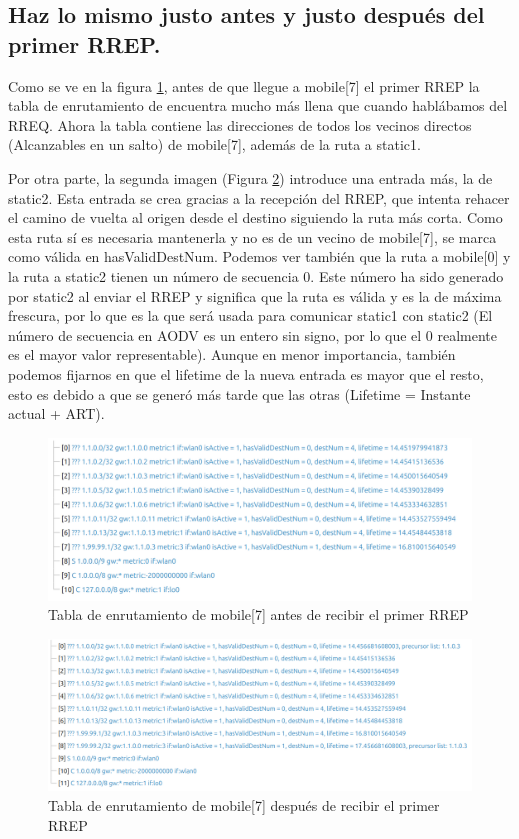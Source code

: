 \subsection{Haz lo mismo justo antes y justo después del primer RREP.}

Como se ve en la figura \ref{fig:rtable_prev_mob7RREP}, antes de que llegue a mobile[7] el primer RREP la tabla de enrutamiento de encuentra mucho más llena que cuando hablábamos del RREQ. Ahora la tabla contiene las direcciones de todos los vecinos directos (Alcanzables en un salto) de mobile[7], además de la ruta a static1.

Por otra parte, la segunda imagen (Figura \ref{fig:rtable_post_mob7RREP}) introduce una entrada más, la de static2. Esta entrada se crea gracias a la recepción del RREP, que intenta rehacer el camino de vuelta al origen desde el destino siguiendo la ruta más corta. Como esta ruta sí es necesaria mantenerla y no es de un vecino de mobile[7], se marca como válida en hasValidDestNum. Podemos ver también que la ruta a mobile[0] y la ruta a static2 tienen un número de secuencia 0. Este número ha sido generado por static2 al enviar el RREP y significa que la ruta es válida y es la de máxima frescura, por lo que es la que será usada para comunicar static1 con static2 (El número de secuencia en AODV es un entero sin signo, por lo que el 0 realmente es el mayor valor representable). Aunque en menor importancia, también podemos fijarnos en que el lifetime de la nueva entrada es mayor que el resto, esto es debido a que se generó más tarde que las otras (Lifetime = Instante actual + ART).

\begin{figure}[H]
    \centering
    \includegraphics[width=125mm, scale=0.75]{imaxes/ejercicio3_1.png}
    \caption{Tabla de enrutamiento de mobile[7] antes de recibir el primer RREP}
    \label{fig:rtable_prev_mob7RREP}
\end{figure}

\begin{figure}[H]
    \centering
    \includegraphics[width=125mm, scale=0.75]{imaxes/ejercicio3_2.png}
    \caption{Tabla de enrutamiento de mobile[7] después de recibir el primer RREP}
    \label{fig:rtable_post_mob7RREP}
\end{figure}

